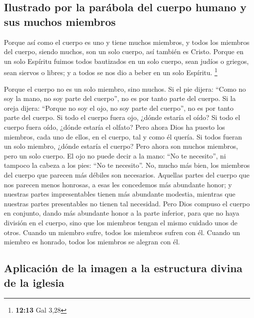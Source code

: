 \begin{paracol}{2}
\hypertarget{ilustrado-por-la-paruxe1bola-del-cuerpo-humano-y-sus-muchos-miembros}{%
\subsection{Ilustrado por la parábola del cuerpo humano y sus muchos
miembros}\label{ilustrado-por-la-paruxe1bola-del-cuerpo-humano-y-sus-muchos-miembros}}

 Porque así como el cuerpo es uno y tiene muchos
miembros, y todos los miembros del cuerpo, siendo muchos, son un solo
cuerpo, así también es Cristo.  Porque en un solo
Espíritu fuimos todos bautizados en un solo cuerpo, sean judíos o
griegos, sean siervos o libres; y a todos se nos dio a beber en un solo
Espíritu. \footnote{\textbf{12:13} Gal 3,28}

 Porque el cuerpo no es un solo miembro, sino muchos.
 Si el pie dijera: ``Como no soy la mano, no soy parte
del cuerpo'', no es por tanto parte del cuerpo.  Si la
oreja dijera: ``Porque no soy el ojo, no soy parte del cuerpo'', no es
por tanto parte del cuerpo.  Si todo el cuerpo fuera ojo,
¿dónde estaría el oído? Si todo el cuerpo fuera oído, ¿dónde estaría el
olfato?  Pero ahora Dios ha puesto los miembros, cada uno
de ellos, en el cuerpo, tal y como él quería.  Si todos
fueran un solo miembro, ¿dónde estaría el cuerpo?  Pero
ahora son muchos miembros, pero un solo cuerpo.  El ojo
no puede decir a la mano: ``No te necesito'', ni tampoco la cabeza a los
pies: ``No te necesito''.  No, mucho más bien, los
miembros del cuerpo que parecen más débiles son necesarios.
 Aquellas partes del cuerpo que nos parecen menos
honrosas, a esas les concedemos más abundante honor; y nuestras partes
impresentables tienen más abundante modestia,  mientras
que nuestras partes presentables no tienen tal necesidad. Pero Dios
compuso el cuerpo en conjunto, dando más abundante honor a la parte
inferior,  para que no haya división en el cuerpo, sino
que los miembros tengan el mismo cuidado unos de otros. 
Cuando un miembro sufre, todos los miembros sufren con él. Cuando un
miembro es honrado, todos los miembros se alegran con él.

\hypertarget{aplicaciuxf3n-de-la-imagen-a-la-estructura-divina-de-la-iglesia}{%
\subsection{Aplicación de la imagen a la estructura divina de la
iglesia}\label{aplicaciuxf3n-de-la-imagen-a-la-estructura-divina-de-la-iglesia}}


\end{paracol}
